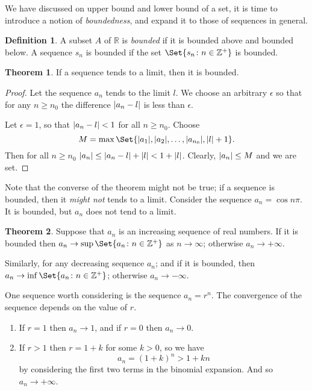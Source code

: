 \documentclass[12pt]{book}
\newcommand{\RR}{\mathbb R}
\newcommand{\ZZ}{\mathbb Z}
\newcommand{\ra}{\rightarrow}
\theoremstyle{definition}
\newtheorem{definition}{Definition}[section]
\newtheorem{theorem}{Theorem}[chapter]
\theoremstyle{remark}
\DeclarePairedDelimiter\abs{\lvert}{\rvert}
\begin{document}
    		We have discussed on upper bound and lower bound of a set, it is time to introduce a notion of \textit{boundedness}, and expand it to those of sequences in general.
    		\begin{definition}
    			A subset $A$ of $\RR$ is \textit{bounded} if it is bounded above and bounded below. A sequence $s_n$ is bounded if the set $\Set{s_n \colon n \in \ZZ^+}$ is bounded.
    		\end{definition}
    		\begin{theorem}
    			If a sequence tends to a limit, then it is bounded.
    		\end{theorem}
    		\begin{proof}
    			Let the sequence $a_n$ tends to the limit $l$. We choose an arbitrary $\epsilon$ so that for any $n \geq n_0$ the difference $\abs{a_n - l}$ is less than $\epsilon$. 
    			
    			Let $\epsilon = 1$, so that $\abs{a_n - l} < 1$ for all $n \geq n_0$. Choose
    			\begin{equation*}
    				M = \max\Set{\abs {a_1} , \abs {a_2}, \ldots, \abs {a_{n_0}}, \abs{l} + 1}.
    			\end{equation*}
    			Then for all $n \geq n_0$ $\abs{a_{n}} \leq \abs{a_{n} - l} + \abs{l} < 1 + \abs{l}$. Clearly, $\abs{a_n} \leq M$ and we are set.
    		\end{proof}
    	Note that the converse of the theorem might not be true; if a sequence is bounded, then it \textit{might not} tends to a limit. Consider the sequence $a_n = \cos n\pi$. It is bounded, but $a_n$ does not tend to a limit.
    		\begin{theorem}
    			Suppose that $a_n$ is an increasing sequence of real numbers. If it is bounded then $a_n \ra \sup\Set{a_n \colon n \in \ZZ^+}$ as $n \ra \infty$; otherwise $a_n \ra +\infty$.
    			
    			Similarly, for any decreasing sequence $a_n$; and if it is bounded, then $a_n \ra {\inf\Set{a_n \colon n \in \ZZ^+}} $; otherwise $a_n \ra -\infty$.
    		\end{theorem}
    	
    		One sequence worth considering is the sequence $a_n = r^n$. The convergence of the sequence depends on the value of $r$.
    		\begin{enumerate}
    			\item If $r = 1$ then $a_n \ra 1$, and if $r = 0$ then $a_n \ra 0$.
    			
    			\item If $r > 1$ then $r = 1 + k$ for some $k > 0$, so we have
    			\begin{equation*}
	    			a_n = \left(1 + k\right)^n > 1 + kn
    			\end{equation*}
    			by considering the first two terms in the binomial expansion. And so $a_n \ra +\infty$.
    		\end{enumerate}
\end{document}
